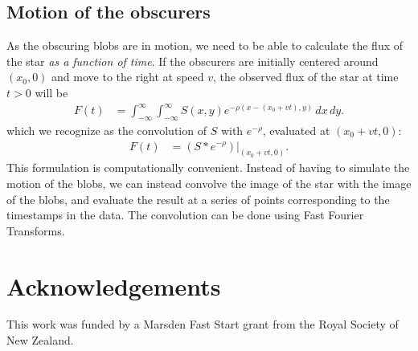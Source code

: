 \documentclass[a4paper,fleqn,usenatbib]{mnras}
\begin{document}
\subsection{Motion of the obscurers}
As the obscuring blobs are in motion, we need to be able to calculate the
flux of the star {\em as a function of time}. If the obscurers
are initially centered around $(x_0, 0)$ and move to the right
at speed $v$, the observed flux of the star at time $t > 0$ will be
\begin{align}
F(t) &= \int_{-\infty}^{\infty}\int_{-\infty}^{\infty}
          S(x, y)e^{-\rho\left(x - (x_0 + vt), y\right)} \, dx \, dy.
\end{align}
which we recognize as the convolution of $S$ with $e^{-\rho}$, evaluated
at $(x_0 + vt, 0)$:
\begin{align}
F(t) &= \left.\left(S * e^{-\rho}\right)\right|_{(x_0 + vt, 0)}.
\end{align}
This formulation is computationally convenient. Instead of having to
simulate the motion of the blobs, we can instead convolve the image of
the star with the image of the blobs, and evaluate the result at a series
of points corresponding to the timestamps in the data.
The convolution can be done using Fast Fourier Transforms.

\section*{Acknowledgements}
This work was funded by a Marsden Fast Start grant from the Royal Society of
New Zealand.












\bsp	%
\label{lastpage}
\end{document}
